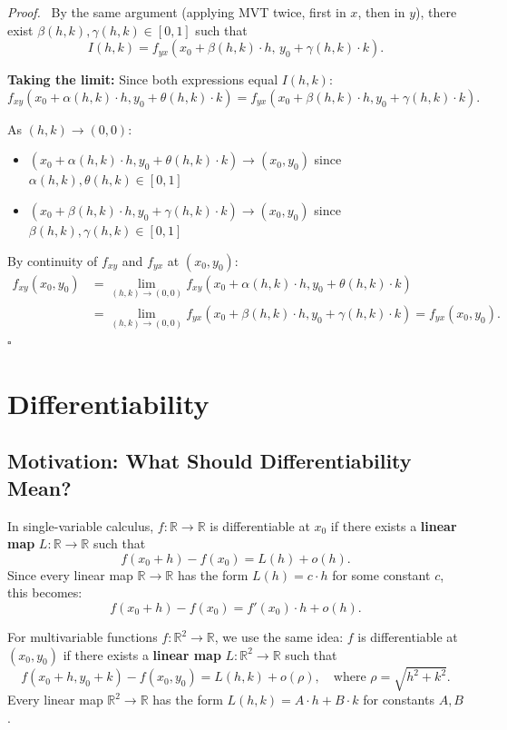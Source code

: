 \documentclass[11pt]{report}
\renewenvironment{proof}[1][Proof]{\par\noindent\textit{#1.}\ }{\hfill$\square$\par\medskip}
\newcommand{\R}{\mathbb{R}}
\begin{document}
\begin{proof}
By the same argument (applying MVT twice, first in $x$, then in $y$), there exist $\beta(h, k), \gamma(h, k) \in [0, 1]$ such that
\[
I(h, k) = f_{yx}(x_0 + \beta(h,k) \cdot h, \, y_0 + \gamma(h,k) \cdot k).
\]

\textbf{Taking the limit:} Since both expressions equal $I(h, k)$:
\[
f_{xy}(x_0 + \alpha(h,k) \cdot h, y_0 + \theta(h,k) \cdot k) = f_{yx}(x_0 + \beta(h,k) \cdot h, y_0 + \gamma(h,k) \cdot k).
\]

As $(h, k) \to (0, 0)$:
\begin{itemize}[itemsep=2pt]
    \item $(x_0 + \alpha(h,k) \cdot h, y_0 + \theta(h,k) \cdot k) \to (x_0, y_0)$ since $\alpha(h,k), \theta(h,k) \in [0, 1]$
    \item $(x_0 + \beta(h,k) \cdot h, y_0 + \gamma(h,k) \cdot k) \to (x_0, y_0)$ since $\beta(h,k), \gamma(h,k) \in [0, 1]$
\end{itemize}

By continuity of $f_{xy}$ and $f_{yx}$ at $(x_0, y_0)$:
\begin{align*}
f_{xy}(x_0, y_0) &= \lim_{(h,k) \to (0,0)} f_{xy}(x_0 + \alpha(h,k) \cdot h, y_0 + \theta(h,k) \cdot k) \\
&= \lim_{(h,k) \to (0,0)} f_{yx}(x_0 + \beta(h,k) \cdot h, y_0 + \gamma(h,k) \cdot k) = f_{yx}(x_0, y_0).
\end{align*}
\end{proof}

\section{Differentiability}

\subsection*{Motivation: What Should Differentiability Mean?}

In single-variable calculus, $f: \R \to \R$ is differentiable at $x_0$ if there exists a \textbf{linear map} $L: \R \to \R$ such that
\[
f(x_0 + h) - f(x_0) = L(h) + o(h).
\]
Since every linear map $\R \to \R$ has the form $L(h) = c \cdot h$ for some constant $c$, this becomes:
\[
f(x_0 + h) - f(x_0) = f'(x_0) \cdot h + o(h).
\]

For multivariable functions $f: \R^2 \to \R$, we use the same idea: $f$ is differentiable at $(x_0, y_0)$ if there exists a \textbf{linear map} $L: \R^2 \to \R$ such that
\[
f(x_0 + h, y_0 + k) - f(x_0, y_0) = L(h, k) + o(\rho), \quad \text{where } \rho = \sqrt{h^2 + k^2}.
\]
Every linear map $\R^2 \to \R$ has the form $L(h, k) = A \cdot h + B \cdot k$ for constants $A, B$.
\end{document}
